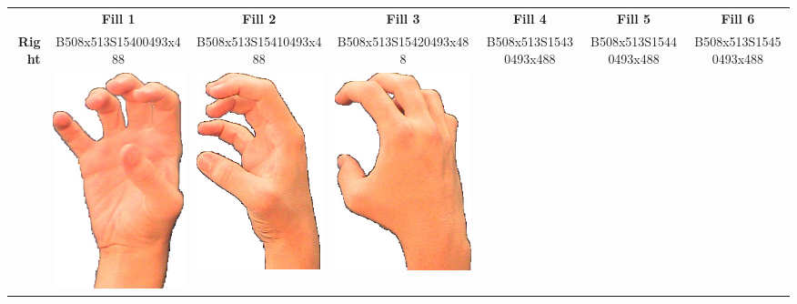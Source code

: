 \documentclass{article}
\begin{document}
\begin{center}
\begin{tabular}{r*{6}{c}}
&\textbf{Fill 1}&\textbf{Fill 2}&\textbf{Fill 3}&\textbf{Fill 4}&\textbf{Fill 5}&\textbf{Fill 6}\\
\multirow{2}{*}{\textbf{Right}}&
B508x513S15400493x488&
B508x513S15410493x488&
B508x513S15420493x488&
B508x513S15430493x488&
B508x513S15440493x488&
B508x513S15450493x488\\
&
\includegraphics[scale=0.1]{images/05-08-1.jpg}&
\includegraphics[scale=0.1]{images/05-08-2.jpg}&
\includegraphics[scale=0.1]{images/05-08-3.jpg}&

\end{tabular}
\end{center}
\end{document}
